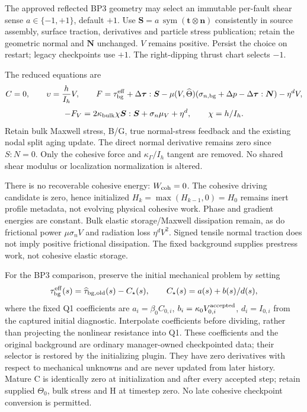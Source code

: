 \documentclass[11pt]{article}
\begin{document}
The approved reflected BP3 geometry may select an immutable per-fault shear
sense $a\in\{-1,+1\}$, default $+1$. Use
$\boldsymbol S=a\,\operatorname{sym}(\boldsymbol t\otimes\boldsymbol n)$
consistently in source assembly, surface traction, derivatives and particle
stress publication; retain the geometric normal and $\boldsymbol N$ unchanged.
$V$ remains positive. Persist the choice on restart; legacy checkpoints use
$+1$. The right-dipping thrust chart selects $-1$.

The reduced equations are
\[
 C=0,\qquad \upsilon=\frac{h}{I_h}V,\qquad
 F=\tau_{\rm bg}^{\rm eff}+\Delta\boldsymbol\tau:\boldsymbol S
 -\mu(V,\widehat\Theta)
 (\sigma_{n,\rm bg}+\Delta p-\Delta\boldsymbol\tau:\boldsymbol N)-\eta^d V,
\]
\[
 -F_V=2\kappa_{\rm bulk}\chi\boldsymbol S:\boldsymbol S
       +\sigma_n\mu_V+\eta^d,\qquad \chi=h/I_h.
\]
Retain bulk Maxwell stress, B/G, true normal-stress feedback and the existing
nodal split aging update. The direct normal derivative remains zero since
$S:N=0$. Only the cohesive force and $\kappa_\Gamma/I_h$ tangent are removed.
No shared shear modulus or localization normalization is altered.

There is no recoverable cohesive energy: $W_{\rm coh}=0$. The cohesive
driving candidate is zero, hence initialized $H_k=\max(H_{k-1},0)=H_0$
remains inert profile metadata, not evolving physical cohesive work. Phase
and gradient energies are constant. Bulk elastic storage/Maxwell dissipation
remain, as do frictional power $\mu\sigma_n V$ and radiation loss $\eta^dV^2$.
Signed tensile normal traction does not imply positive frictional dissipation.
The fixed background supplies prestress work, not cohesive elastic storage.

For the BP3 comparison, preserve the initial mechanical problem by setting
\[
 \tau_{\rm bg}^{\rm eff}(s)=\widehat\tau_{\rm bg,old}(s)-C_\star(s),\qquad
 C_\star(s)=a(s)+b(s)/d(s),
\]
where the fixed Q1 coefficients are $a_i=\beta_0 C_{0,i}$,
$b_i=\kappa_0 V_{0,i}^{\rm accepted}$, $d_i=I_{0,i}$ from the captured
initial diagnostic. Interpolate coefficients before dividing, rather than
projecting the nonlinear resistance into Q1. These coefficients and the
original background are ordinary manager-owned checkpointed data; their
selector is restored by the initializing plugin. They have zero derivatives
with respect to mechanical unknowns and are never updated from later history.
Mature C is identically zero at initialization and after every accepted step;
retain supplied $\Theta_0$, bulk stress and H at timestep zero. No late
cohesive checkpoint conversion is permitted.
\end{document}
